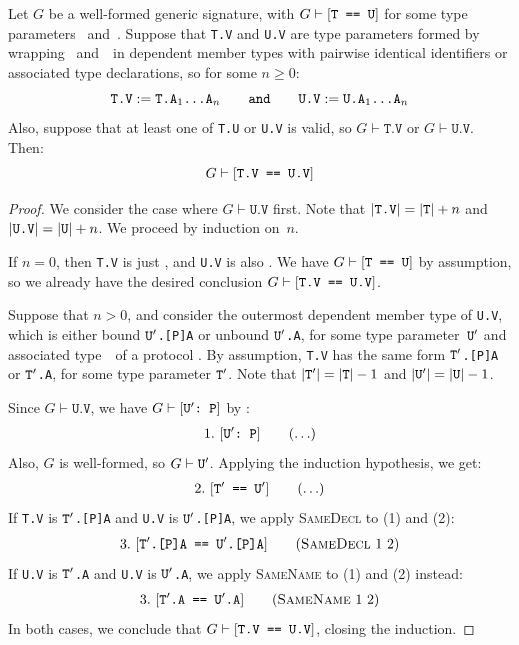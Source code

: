 \documentclass[../generics]{subfiles}
\begin{document}
\begin{lemma}\label{general member type}
Let $G$ be a well-formed generic signature, with $G\vdash[\texttt{T == U}]$ for some type parameters \tT~and~\tU. Suppose that \texttt{T.V} and \texttt{U.V} are type parameters formed by wrapping \tT~and~\tU\ in dependent member types with pairwise identical identifiers or associated type declarations, so for some $n\geq 0$:
\[
\texttt{T.V} := \texttt{T.$\texttt{A}_1$...$\texttt{A}_n$} \qquad \texttt{and} \qquad \texttt{U.V} := \texttt{U.$\texttt{A}_1$...$\texttt{A}_n$}
\]
Also, suppose that at least one of \texttt{T.U} or \texttt{U.V} is valid, so $G\vdash\texttt{T.V}$ or $G\vdash\texttt{U.V}$. Then:
\[
G\vdash[\texttt{T.V == U.V}]
\]
\end{lemma}
\begin{proof}
We consider the case where $G\vdash\texttt{U.V}$ first. Note that $|\texttt{T.V}|=|\texttt{T}| + n$ and $|\texttt{U.V}|=|\texttt{U}|+n$. We proceed by induction on~$n$.

\BaseCase If $n=0$, then \texttt{T.V} is just \tT, and \texttt{U.V} is also \tU. We have $G\vdash[\texttt{T == U}]$ by assumption, so we already have the desired conclusion $G\vdash[\texttt{T.V == U.V}]$.

\InductiveStep Suppose that $n>0$, and consider the outermost dependent member type of \texttt{U.V}, which is either bound \texttt{$\texttt{U}'$.[P]A} or unbound \texttt{$\texttt{U}'$.A}, for some type parameter~$\texttt{U}'$ and associated type~\nA\ of a protocol \tP. By assumption, \texttt{T.V} has the same form \texttt{$\texttt{T}'$.[P]A} or \texttt{$\texttt{T}'$.A}, for some type parameter $\texttt{T}'$. Note that $|\texttt{T}'|=|\texttt{T}|-1$ and $|\texttt{U}'|=|\texttt{U}|-1$.

Since $G\vdash\texttt{U.V}$, we have $G\vdash[\texttt{$\texttt{U}'$:~P}]$ by :
\begin{gather*}
\AnyStep{\ConfReq{$\tUp$}{P}}{1}
\end{gather*}
Also, $G$ is well-formed, so $G\vdash\texttt{U}'$. Applying the induction hypothesis, we get:
\begin{gather*}
\AnyStep{\SameReq{$\tTp$}{$\tUp$}}{2}
\end{gather*}
If \texttt{T.V} is \texttt{$\texttt{T}'$.[P]A} and \texttt{U.V} is \texttt{$\texttt{U}'$.[P]A}, we apply \textsc{SameDecl} to (1) and (2):
\begin{gather*}
\SameDeclStep{1}{2}{$\tTp$.[P]A}{$\tUp$.[P]A}{3}
\end{gather*}
If \texttt{U.V} is \texttt{$\texttt{T}'$.A} and \texttt{U.V} is \texttt{$\texttt{U}'$.A}, we apply \textsc{SameName} to (1) and (2) instead:
\begin{gather*}
\SameNameStep{1}{2}{$\tTp$.A}{$\tUp$.A}{3}
\end{gather*}
In both cases, we conclude that $G\vdash[\texttt{T.V == U.V}]$, closing the induction.


\end{proof}
\end{document}
